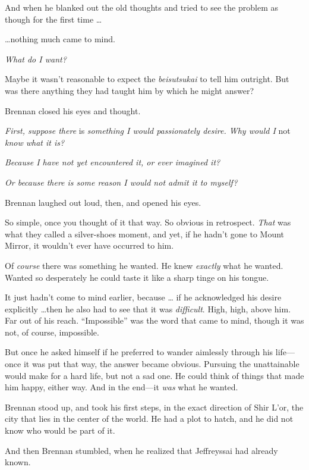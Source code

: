 {
 And when he blanked out the old thoughts and tried to see the
problem as though for the first time \ldots}

{
 \ldots nothing much came to mind.}

{
 \textit{What do I want?}}

{
 Maybe it wasn't reasonable to expect the
\textit{beisutsukai} to tell him outright. But was there anything they
had taught him by which he might answer?}

{
 Brennan closed his eyes and thought.}

{
 \textit{First, suppose there} is \textit{something I would
passionately desire. Why would I} not \textit{know what it is?}}

{
 \textit{Because I have not yet encountered it, or ever imagined
it?}}

{
 \textit{Or because there is some reason I would not admit it to
myself?}}

{
 Brennan laughed out loud, then, and opened his eyes.}

{
 So simple, once you thought of it that way. So obvious in
retrospect. \textit{That} was what they called a silver-shoes moment,
and yet, if he hadn't gone to Mount Mirror, it
wouldn't ever have occurred to him.}

{
 Of \textit{course} there was something he wanted. He knew
\textit{exactly} what he wanted. Wanted so desperately he could taste
it like a sharp tinge on his tongue.}

{
 It just hadn't come to mind earlier, because \ldots
if he acknowledged his desire explicitly \ldots then he also had to see
that it was \textit{difficult}. High, high, above him. Far out of his
reach. ``Impossible'' was the word
that came to mind, though it was not, of course, impossible.}

{
 But once he asked himself if he preferred to wander aimlessly
through his life---once it was put that way, the answer became obvious.
Pursuing the unattainable would make for a hard life, but not a sad
one. He could think of things that made him happy, either way. And in
the end---it \textit{was} what he wanted.}

{
 Brennan stood up, and took his first steps, in the exact direction
of Shir L'or, the city that lies in the center of the
world. He had a plot to hatch, and he did not know who would be part of
it.}

{
 And then Brennan stumbled, when he realized that Jeffreyssai had
already known.}

